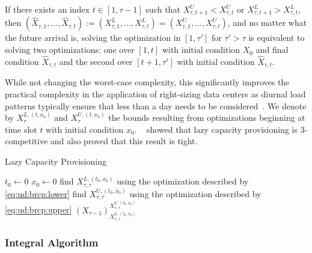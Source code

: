 \begin{lemma}
\cite{Lin2011} If there exists an index $t \in [1, \tau-1]$ such that $X_{\tau,t+1}^U < X_{\tau,t}^U$ or $X_{\tau,t+1}^L > X_{\tau,t}^L$, then $(\hat{X}_{\tau,1},\dots,\hat{X}_{\tau,t}) := (X_{\tau,1}^L,\dots,X_{\tau,t}^L) = (X_{\tau,1}^U,\dots,X_{\tau,t}^U)$, and no matter what the future arrival is, solving the optimization in $[1,\tau']$ for $\tau' > \tau$ is equivalent to solving two optimizations: one over $[1,t]$ with initial condition $X_0$ and final condition $\hat{X}_{\tau,t}$ and the second over $[t+1,\tau']$ with initial condition $\hat{X}_{\tau,t}$.
\end{lemma}

While not changing the worst-case complexity, this significantly improves the practical complexity in the application of right-sizing data centers as diurnal load patterns typically ensure that less than a day needs to be considered~\cite{Lin2011}. We denote by $X_{\tau}^{L,(t,x_0)}$ and $X_{\tau}^{U,(t,x_0)}$ the bounds resulting from optimizations beginning at time slot $t$ with initial condition $x_0$. \citeauthor{Lin2011}~\cite{Lin2011} showed that lazy capacity provisioning is $3$-competitive and also proved that this result is tight.

\begin{algorithm}
    \caption{Lazy Capacity Provisioning~\cite{Lin2011}}\label{alg:ud:lcp}
    $t_0 \gets 0$\;
    $x_0 \gets 0$\;
    find $X_{\tau,\tau}^{L,(t_0,x_0)}$ using the optimization described by \cref{eq:ud:brcp:lower}\;
    find $X_{\tau,\tau}^{U,(t_0,x_0)}$ using the optimization described by \cref{eq:ud:brcp:upper}\;
    \Return $(X_{\tau-1})_{X_{\tau,\tau}^{L,(t_0,x_0)}}^{X_{\tau,\tau}^{U,(t_0,x_0)}}$\;
\end{algorithm}

\subsubsection{Integral Algorithm}

